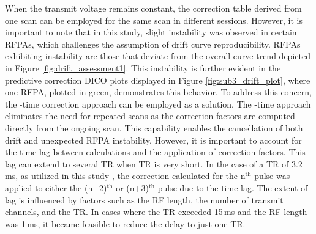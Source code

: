 When the transmit voltage remains constant, the correction table derived from one scan can be employed for the same scan in different sessions. However, it is important to note that in this study, slight instability was observed in certain RFPAs, which challenges the assumption of drift curve reproducibility. RFPAs exhibiting instability are those that deviate from the overall curve trend depicted in Figure \ref{fig:drift_assessment1}. This instability is further evident in the predictive correction DICO plots displayed in Figure \ref{fig:sub3_drift_plot}, where one RFPA, plotted in green, demonstrates this behavior. To address this concern, the -time correction approach can be employed as a solution. The -time approach eliminates the need for repeated scans as the correction factors are computed directly from the ongoing scan. This capability enables the cancellation of both drift and unexpected RFPA instability. However, it is important to account for the time lag between calculations and the application of correction factors. This lag can extend to several TR when TR is very short. In the case of a TR of 3.2\,ms, as utilized in this study , the correction calculated for the n$^\text{th}$ pulse was applied to either the (n+2)$^\text{th}$ or (n+3)$^\text{th}$ pulse due to the time lag. The extent of lag is influenced by factors such as the RF length, the number of transmit channels, and the TR. In cases where the TR exceeded 15\,ms and the RF length was 1\,ms, it became feasible to reduce the delay to just one TR.


